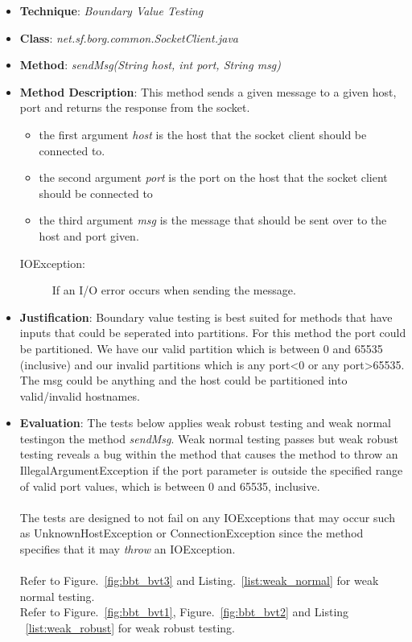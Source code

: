 \documentclass[fontsize=12pt,paper=letter,twoside]{scrartcl}
\begin{document}
\begin{itemize}
\item \textbf{Technique}: \emph{Boundary Value Testing}
\item \textbf{Class}: \emph{net.sf.borg.common.SocketClient.java}
\item \textbf{Method}: \emph{sendMsg(String host, int port, String msg)}
\item \textbf{Method Description}:
This method sends a given message to a given host, port and returns the response from the socket.
\begin{itemize}
\item the first argument \emph{host} is the host that the socket client should be connected to.
\item the second argument \emph{port} is the port on the host that the socket client should be connected to
\item the third argument \emph{msg} is the message that should be sent over to the host and port given.
\end{itemize}
\begin{description}
\item[IOException:] If an I/O error occurs when sending the message.
\end{description}
\item \textbf{Justification}: Boundary value testing is best suited for methods that have inputs that could be seperated into partitions. For this method the port could be partitioned. We have our valid partition which is between 0 and 65535 (inclusive) and our invalid partitions which is any port\textless 0 or any port\textgreater 65535. The msg could be anything and the host could be partitioned into valid/invalid hostnames.
\item \textbf{Evaluation}: The tests below applies weak robust testing and weak normal testingon the method \emph{sendMsg}. Weak normal testing passes but weak robust testing reveals a bug within the method that causes the method to throw an \mbox{IllegalArgumentException} if the port parameter is outside the specified range of valid port values, which is between 0 and 65535, inclusive.\\ \\
The tests are designed to not fail on any  \mbox{IOExceptions} that may occur such as \mbox{UnknownHostException} or \mbox{ConnectionException} since the method specifies that it may \emph{throw} an \mbox{IOException}. \\ \\
Refer to Figure.~\ref{fig:bbt_bvt3} and Listing.~\ref{list:weak_normal} for weak normal testing.\\Refer to Figure.~\ref{fig:bbt_bvt1}, Figure.~\ref{fig:bbt_bvt2} and Listing ~\ref{list:weak_robust} for weak robust testing.


\end{itemize}
\end{document}
